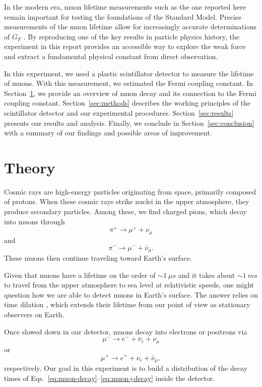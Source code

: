 \documentclass{../paper}
\begin{document}
In the modern era, muon lifetime measurements such as the one reported here remain important for testing the foundations of the Standard Model. Precise measurements of the muon lifetime allow for increasingly accurate determinations of $G_F$ \cite{Chitwood2007}. By reproducing one of the key results in particle physics history, the experiment in this report provides an accessible way to explore the weak force and extract a fundamental physical constant from direct observation.

In this experiment, we used a plastic scintillator detector to measure the lifetime of muons. With this measurement, we estimated the Fermi coupling constant. In Section~\ref{sec:theory}, we provide an overview of muon decay and its connection to the Fermi coupling constant. Section~\ref{sec:methods} describes the working principles of the scintillator detector and our experimental procedures. Section~\ref{sec:results} presents our results and analysis. Finally, we conclude in Section~\ref{sec:conclusion} with a summary of our findings and possible areas of improvement.

\section{Theory} \label{sec:theory}

Cosmic rays are high-energy particles originating from space, primarily composed of protons. When these cosmic rays strike nuclei in the upper atmosphere, they produce secondary particles. Among these, we find charged pions, which decay into muons through
\begin{equation}
  \pi^+ \to \mu^+ + \nu_\mu
\end{equation}
and
\begin{equation}
  \pi^- \to \mu^- + \bar\nu_\mu.
\end{equation}
These muons then continue traveling toward Earth's surface.

Given that muons have a lifetime on the order of $\sim 1 \ \mu s$ and it takes about $\sim 1 \ ms$ to travel from the upper atmosphere to sea level at relativistic speeds, one might question how we are able to detect muons in Earth's surface. The answer relies on time dilation \cite{TeachSpinManual}, which extends their lifetime from our point of view as stationary observers on Earth.

Once slowed down in our detector, muons decay into electrons or positrons via
\begin{equation}\label{eq:muon-decay}
  \mu^- \to e^- + \bar\nu_e + \nu_\mu
\end{equation}
or
\begin{equation}\label{eq:muon+decay}
  \mu^+ \to e^+ + \nu_e + \bar\nu_\mu,
\end{equation}
respectively. Our goal in this experiment is to build a distribution of the decay times of Eqs.~\eqref{eq:muon-decay}--\eqref{eq:muon+decay} inside the detector.
\end{document}
